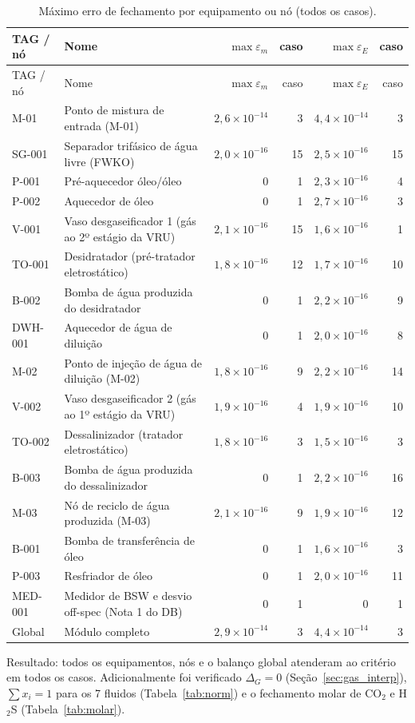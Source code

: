 \documentclass[11pt,a4paper]{article}
\numberwithin{equation}{section}
\numberwithin{table}{section}
\numberwithin{figure}{section}
\begin{document}
\begin{longtable}{lL{6.8cm}rrrr}
\caption{Máximo erro de fechamento por equipamento ou nó (todos os casos).}\label{tab:fech}\\\toprule
TAG / nó & Nome & $\max\varepsilon_m$ & caso & $\max\varepsilon_E$ & caso\\\midrule\endfirsthead
\toprule TAG / nó & Nome & $\max\varepsilon_m$ & caso & $\max\varepsilon_E$ & caso\\\midrule\endhead

M-01 & Ponto de mistura de entrada (M-01) & $2{,}6\times10^{-14}$ & 3 & $4{,}4\times10^{-14}$ & 3\\
SG-001 & Separador trifásico de água livre (FWKO) & $2{,}0\times10^{-16}$ & 15 & $2{,}5\times10^{-16}$ & 15\\
P-001 & Pré-aquecedor óleo/óleo & $0$ & 1 & $2{,}3\times10^{-16}$ & 4\\
P-002 & Aquecedor de óleo & $0$ & 1 & $2{,}7\times10^{-16}$ & 3\\
V-001 & Vaso desgaseificador 1 (gás ao 2º estágio da VRU) & $2{,}1\times10^{-16}$ & 15 & $1{,}6\times10^{-16}$ & 1\\
TO-001 & Desidratador (pré-tratador eletrostático) & $1{,}8\times10^{-16}$ & 12 & $1{,}7\times10^{-16}$ & 10\\
B-002 & Bomba de água produzida do desidratador & $0$ & 1 & $2{,}2\times10^{-16}$ & 9\\
DWH-001 & Aquecedor de água de diluição & $0$ & 1 & $2{,}0\times10^{-16}$ & 8\\
M-02 & Ponto de injeção de água de diluição (M-02) & $1{,}8\times10^{-16}$ & 9 & $2{,}2\times10^{-16}$ & 14\\
V-002 & Vaso desgaseificador 2 (gás ao 1º estágio da VRU) & $1{,}9\times10^{-16}$ & 4 & $1{,}9\times10^{-16}$ & 10\\
TO-002 & Dessalinizador (tratador eletrostático) & $1{,}8\times10^{-16}$ & 3 & $1{,}5\times10^{-16}$ & 3\\
B-003 & Bomba de água produzida do dessalinizador & $0$ & 1 & $2{,}2\times10^{-16}$ & 16\\
M-03 & Nó de reciclo de água produzida (M-03) & $2{,}1\times10^{-16}$ & 9 & $1{,}9\times10^{-16}$ & 12\\
B-001 & Bomba de transferência de óleo & $0$ & 1 & $1{,}6\times10^{-16}$ & 3\\
P-003 & Resfriador de óleo & $0$ & 1 & $2{,}0\times10^{-16}$ & 11\\
MED-001 & Medidor de BSW e desvio off-spec (Nota 1 do DB) & $0$ & 1 & $0$ & 1\\
\midrule Global & Módulo completo & $2{,}9\times10^{-14}$ & 3 & $4{,}4\times10^{-14}$ & 3\\
\bottomrule\end{longtable}
Resultado: todos os equipamentos, nós e o balanço global atenderam ao critério em todos os casos. Adicionalmente foi verificado $\Delta_G=0$ (Seção~\ref{sec:gas_interp}), $\sum x_i=1$ para os 7 fluidos (Tabela~\ref{tab:norm}) e o fechamento molar de CO$_2$ e H$_2$S (Tabela~\ref{tab:molar}).
\end{document}
